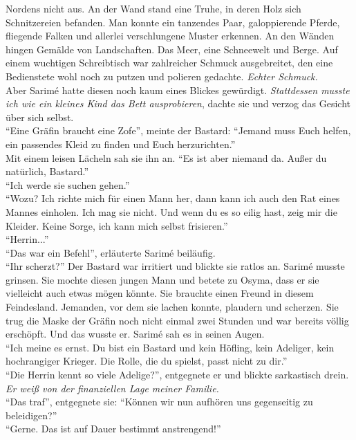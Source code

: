 Nordens nicht aus. An der Wand stand eine Truhe, in deren Holz sich Schnitzereien befanden. Man 
konnte ein tanzendes Paar, galoppierende Pferde, fliegende Falken und allerlei verschlungene Muster 
erkennen. An den Wänden hingen Gemälde von Landschaften. Das Meer, eine Schneewelt und Berge. Auf 
einem wuchtigen Schreibtisch war zahlreicher Schmuck ausgebreitet, den eine Bedienstete wohl noch zu 
putzen und polieren gedachte. \textit{Echter Schmuck.}\\
Aber Sarimé hatte diesen noch kaum eines Blickes gewürdigt. \textit{Stattdessen musste ich wie ein 
kleines Kind das Bett ausprobieren}, dachte sie und verzog das Gesicht über sich selbst.\\
``Eine Gräfin braucht eine Zofe'', meinte der Bastard: ``Jemand muss Euch helfen, ein passendes 
Kleid zu finden und Euch herzurichten.''\\
Mit einem leisen Lächeln sah sie ihn an. ``Es ist aber niemand da. Außer du natürlich, Bastard.''\\
``Ich werde sie suchen gehen.''\\
``Wozu? Ich richte mich für einen Mann her, dann kann ich auch den Rat eines Mannes einholen. Ich 
mag sie nicht. Und wenn du es so eilig hast, zeig mir die Kleider. Keine Sorge, ich kann mich 
selbst frisieren.''\\
``Herrin...''\\
``Das war ein Befehl'', erläuterte Sarimé beiläufig. \\
``Ihr scherzt?'' Der Bastard war irritiert und blickte sie ratlos an. Sarimé musste grinsen. Sie 
mochte diesen jungen Mann und betete zu Osyma, dass er sie vielleicht auch etwas mögen könnte. Sie 
brauchte einen Freund in diesem Feindesland. Jemanden, vor dem sie lachen konnte, plaudern 
und scherzen. Sie trug die Maske der Gräfin noch nicht einmal zwei Stunden und war bereits völlig 
erschöpft. Und das wusste er. Sarimé sah es in seinen Augen.\\
``Ich meine es ernst. Du bist ein Bastard und kein Höfling, kein Adeliger, kein hochrangiger 
Krieger. Die Rolle, die du spielst, passt nicht zu dir.''\\
``Die Herrin kennt so viele Adelige?'', entgegnete er und blickte sarkastisch drein.\\
\textit{Er weiß von der finanziellen Lage meiner Familie.}\\ 
``Das traf'', entgegnete sie: ``Können wir nun aufhören uns gegenseitig zu beleidigen?''\\
``Gerne. Das ist auf Dauer bestimmt anstrengend!''\\
